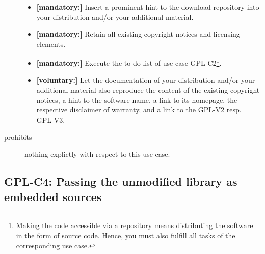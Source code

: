\begin{description}
\begin{itemize}
  \item \textbf{[mandatory:]} Insert a prominent hint to the download repository
  into your distribution and/or your additional material.

  \item \textbf{[mandatory:]} Retain all existing copyright notices and
  licensing elements.
    
  \item \textbf{[mandatory:]} Execute the to-do list of use case GPL-C2\footnote{
  Making the code accessible via a repository means distributing the software in
  the form of source code. Hence, you must also fulfill all tasks of the
  corresponding use case.}.

  \item \textbf{[voluntary:]} Let the documentation of your distribution and/or
  your additional material also reproduce the content of the existing
  copyright notices, a hint to the software name, a link to its homepage,
  the respective disclaimer of warranty, and a link to the GPL-V2 resp.
  GPL-V3.

\end{itemize}

\item[prohibits] nothing explictly with respect to this use case.

\end{description}

\subsection{GPL-C4: Passing the unmodified library as embedded sources}
\label{OSUC-07S-GPL} 

